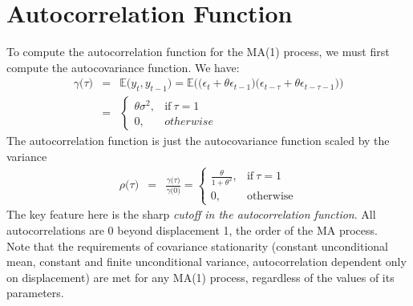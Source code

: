 \section{Autocorrelation Function}
To compute the autocorrelation function for the MA(1) process, we must first compute the autocovariance function. We have:
\begin{eqnarray}
	\nonumber
	\gamma\big(\tau\big) &=& \mathbb{E}\big(y_{t}, y_{t - 1}\big) = \mathbb{E}\bigg(\Big(\epsilon_{t} + \theta\epsilon_{t - 1}\Big)\Big(\epsilon_{t - \tau} + \theta\epsilon_{t - \tau - 1}\Big)\bigg)\\
	&=& \begin{cases}
		\theta\sigma^{2}, & \text{if}\ \tau = 1\\
		0, & \text{}otherwise	
	\end{cases}
\end{eqnarray}
The autocorrelation function is just the autocovariance function scaled by the variance
\begin{eqnarray}
	\rho\big(\tau\big) &=& \frac{\gamma\big(\tau\big)}{\gamma\big(0\big)} = \begin{cases}
		\frac{\theta}{1 + \theta^{2}}, & \text{if}\ \tau = 1\\
		0, & \text{otherwise}
	\end{cases}
\end{eqnarray}
The key feature here is the sharp \textit{cutoff in the autocorrelation function}. All autocorrelations are 0 beyond displacement 1, the order of the MA process.\\
Note that the requirements of covariance stationarity (constant unconditional mean, constant and finite unconditional variance, autocorrelation dependent only on displacement) are met for any MA(1) process, regardless of the values of its parameters.

